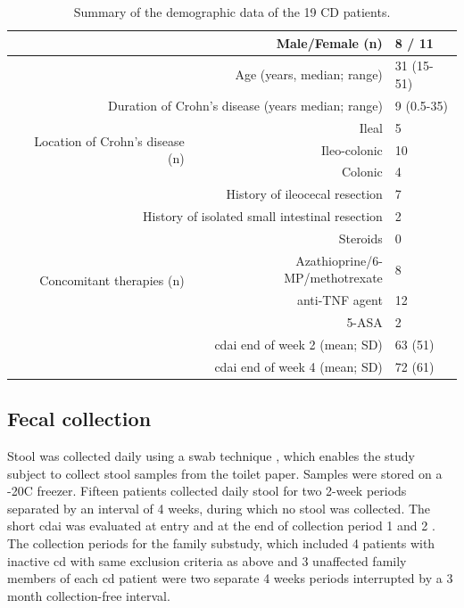 \begin{table}[htbp]
    \centering
    \caption{Summary of the demographic data of the 19 CD patients.}
    \label{id-tabMethods}
    \begin{tabular}{rrl}
    \toprule
         \multicolumn{2}{r}{Male/Female (n)} &	8 / 11\\
    \midrule
    \multicolumn{2}{r}{Age (years, median; range)} &	31 (15-51)\\
\midrule
\multicolumn{2}{r}{Duration of Crohn’s disease (years median; range)} &	9 (0.5-35)\\
\midrule
\multirow{3}{*}{Location of Crohn's disease (n)} & 	Ileal & 5\\
 &   	Ileo-colonic & 10\\
 &     	Colonic	 & 4\\
\midrule
\multicolumn{2}{r}{History of ileocecal resection} &	7\\
\midrule
\multicolumn{2}{r}{History of isolated small intestinal resection} &	2\\
\midrule
\multirow{4}{*}{Concomitant therapies (n)} &        	Steroids & 0\\
&        	Azathioprine/6-MP/methotrexate & 8\\
 &        	anti-TNF agent & 12\\
     &   	5-ASA	 &2\\
\midrule
\multicolumn{2}{r}{\gls{cdai} end of week 2 (mean; SD)} &	63 (51)\\
\midrule
\multicolumn{2}{r}{\gls{cdai} end of week 4 (mean; SD)} &	72 (61)\\
\bottomrule
    \end{tabular}
\end{table}

\subsection{Fecal collection}

Stool was collected daily using a swab technique \cite{RN4220}, which enables the study subject to collect stool samples from the toilet paper. Samples were stored on a -20\textdegree C freezer. Fifteen patients collected daily stool for two 2-week periods separated by an interval of 4 weeks, during which no stool was collected.  The short \gls{cdai} was evaluated at entry and at the end of collection period 1 and 2 \cite{RN4006}. The collection periods for the family substudy, which included 4 patients with inactive \gls{cd} with same exclusion criteria as above and 3 unaffected family members of each \gls{cd} patient were two separate 4 weeks periods interrupted by a 3 month collection-free interval.

